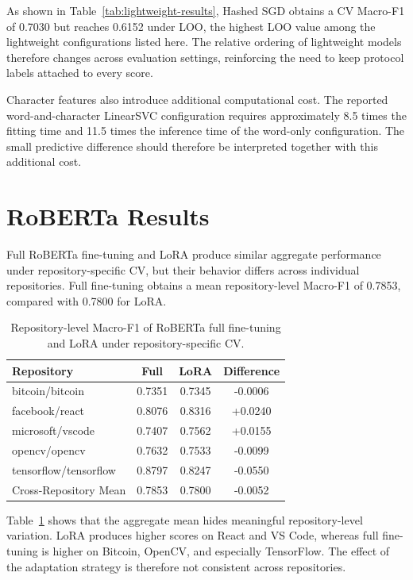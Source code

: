 As shown in Table~\ref{tab:lightweight-results}, Hashed SGD obtains a CV Macro-F1 of 0.7030 but reaches 0.6152 under LOO, the highest LOO value among the lightweight configurations listed here. The relative ordering of lightweight models therefore changes across evaluation settings, reinforcing the need to keep protocol labels attached to every score.

Character features also introduce additional computational cost. The reported word-and-character LinearSVC configuration requires approximately 8.5 times the fitting time and 11.5 times the inference time of the word-only configuration. The small predictive difference should therefore be interpreted together with this additional cost.

\section{RoBERTa Results}
Full RoBERTa fine-tuning and LoRA produce similar aggregate performance under repository-specific CV, but their behavior differs across individual repositories. Full fine-tuning obtains a mean repository-level Macro-F1 of 0.7853, compared with 0.7800 for LoRA.

\begin{table}[H]
\centering
\caption{Repository-level Macro-F1 of RoBERTa full fine-tuning and LoRA under repository-specific CV.}
\label{tab:roberta-repo-results}
\begin{tabular}{lccc}
\toprule
\textbf{Repository} & \textbf{Full} & \textbf{LoRA} & \textbf{Difference} \\
\midrule
bitcoin/bitcoin & 0.7351 & 0.7345 & -0.0006 \\
facebook/react & 0.8076 & 0.8316 & +0.0240 \\
microsoft/vscode & 0.7407 & 0.7562 & +0.0155 \\
opencv/opencv & 0.7632 & 0.7533 & -0.0099 \\
tensorflow/tensorflow & 0.8797 & 0.8247 & -0.0550 \\
\midrule
Cross-Repository Mean & 0.7853 & 0.7800 & -0.0052 \\
\bottomrule
\end{tabular}
\end{table}

Table~\ref{tab:roberta-repo-results} shows that the aggregate mean hides meaningful repository-level variation. LoRA produces higher scores on React and VS Code, whereas full fine-tuning is higher on Bitcoin, OpenCV, and especially TensorFlow. The effect of the adaptation strategy is therefore not consistent across repositories.

